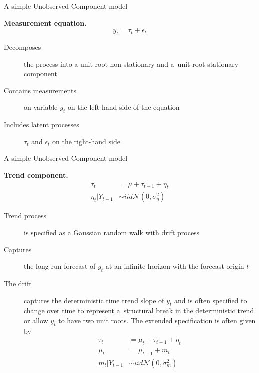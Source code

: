 \documentclass[notes,blackandwhite,mathsans,usenames,dvipsnames]{beamer}
\begin{document}
\begin{frame}{A simple Unobserved Component model}

\textbf{Measurement equation.}
$$y_t = \tau_t + \epsilon_t$$

\begin{description}
\item[Decomposes] {\color{mcxs2}the process into a unit-root non-stationary and a~unit-root stationary component}
\item[Contains measurements] {\color{mcxs2}on variable} $y_t$ {\color{mcxs2}on the left-hand side of the equation}
\item[Includes latent processes] $\tau_t$ {\color{mcxs2}and} $\epsilon_t$ {\color{mcxs2}on the right-hand side}
\end{description}
\end{frame}


\begin{frame}{A simple Unobserved Component model}

\bigskip
\textbf{Trend component.}
\begin{align*}
\tau_t &= \mu + \tau_{t-1} + \eta_t\\
\eta_t|Y_{t-1} &\sim iid\mathcal{N}\left(0,\sigma_\eta^2\right)
\end{align*}

\bigskip\begin{description}
\item[Trend process] {\color{mcxs2}is specified as a Gaussian random walk with drift process }
\item[Captures] {\color{mcxs2}the long-run forecast of} $y_t$ {\color{mcxs2}at an infinite horizon with the forecast origin} $t$
\item[The drift] {\color{mcxs2}captures the deterministic time trend slope of} $y_t$ {\color{mcxs2}and is often specified to change over time to represent a~structural break in the deterministic trend or allow } $y_t$ {\color{mcxs2}to have two unit roots.  The extended specification is often given by} 
\begin{align*}
\tau_t &= \mu_t + \tau_{t-1} + \eta_t\\
\mu_t &= \mu_{t-1} + m_t\\
m_t|Y_{t-1} &\sim iid\mathcal{N}\left(0,\sigma_m^2\right)
\end{align*}
\end{description}
\end{frame}
\end{document}
